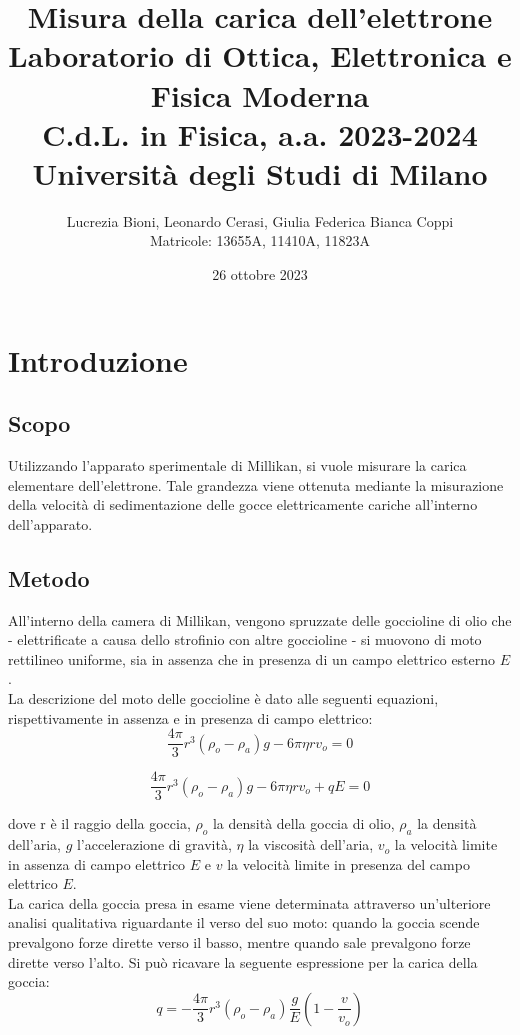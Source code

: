 \documentclass[]{article}
\title{%
    \Huge Misura della carica dell'elettrone \\
    \Large Laboratorio di Ottica, Elettronica e Fisica Moderna \\ C.d.L. in Fisica, a.a. 2023-2024 \\ Università degli Studi di Milano}
\author{\LARGE Lucrezia Bioni, Leonardo Cerasi, Giulia Federica Bianca Coppi \\ Matricole: 13655A, 11410A, 11823A}
\date{26 ottobre 2023}
\let\oldsection\section%
\renewcommand{\section}{%
	\renewcommand{\theequation}{\thesection.\arabic{equation}}%
	\oldsection}%
\let\oldsubsection\subsection%
\renewcommand{\subsection}{%
	\renewcommand{\theequation}{\thesubsection.\arabic{equation}}%
	\oldsubsection}%
\begin{document}
    \maketitle

    \section{Introduzione}
    \subsection{Scopo}
    Utilizzando l'apparato sperimentale di Millikan, si vuole misurare la carica elementare dell'elettrone. Tale grandezza viene ottenuta mediante la misurazione della velocità di sedimentazione delle gocce elettricamente cariche all'interno dell'apparato.

    \subsection{Metodo}
    All'interno della camera di Millikan, vengono spruzzate delle goccioline di olio che - elettrificate a causa dello strofinio con altre goccioline - si muovono di moto rettilineo uniforme, sia in assenza che in presenza di un campo elettrico esterno $E$. \\ La descrizione del moto delle goccioline è dato alle seguenti equazioni, rispettivamente in assenza e in presenza di campo elettrico: 
    \begin{equation}
        \label{moto1}
        \frac{4 \pi}{3} r^3 (\rho_o - \rho_a) g - 6 \pi \eta r v_o = 0
    \end{equation}
        
    \begin{equation}
        \label{moto2}
        \frac{4 \pi}{3} r^3 (\rho_o - \rho_a) g - 6 \pi \eta r v_o + qE= 0
    \end{equation}

    dove r è il raggio della goccia, $\rho_o $ la densità della goccia di olio, $ \rho_a$ la densità dell'aria, $g$ l'accelerazione di gravità, $\eta$ la viscosità dell'aria, $v_o$ la velocità limite in assenza di campo elettrico $E$ e $v$ la velocità limite in presenza del campo elettrico $E$.\\
    La carica della goccia presa in esame viene determinata attraverso un'ulteriore analisi qualitativa riguardante il verso del suo moto: quando la goccia scende prevalgono forze dirette verso il basso, mentre quando sale prevalgono forze dirette verso l'alto. Si può ricavare la seguente espressione per la carica della goccia:
    \begin{equation}
        \label{carica-def}
        q= - \frac{4 \pi}{3} r^3 (\rho_o - \rho_a) \frac{g}{E} \left( 1 - \frac{v}{v_o} \right)
    \end{equation}
\end{document}
